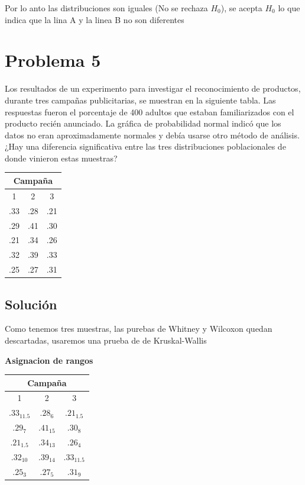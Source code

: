 \documentclass{article}
\begin{document}
Por lo anto las distribuciones son iguales (No se rechaza $H_0$), se acepta $H_0$ lo que indica que la lina A y la linea B no son diferentes

\section{Problema 5}
Los resultados de un experimento para investigar el reconocimiento de productos, durante tres campañas publicitarias, se muestran en la siguiente tabla. Las respuestas fueron el porcentaje de 400 adultos que estaban familiarizados con el producto recién anunciado. La gráfica de probabilidad normal indicó que los datos no eran aproximadamente normales y debía usarse otro método de análisis. ¿Hay una diferencia significativa entre las tres distribuciones poblacionales de donde vinieron estas muestras?

\begin{center}
    \begin{tabular}{c |c |c}
        \multicolumn{3}{c}{Campaña} \\
        \hline
        1   & 2   & 3               \\
        .33 & .28 & .21             \\
        .29 & .41 & .30             \\
        .21 & .34 & .26             \\
        .32 & .39 & .33             \\
        .25 & .27 & .31             \\
    \end{tabular}
\end{center}

\subsection*{Solución}

Como tenemos tres muestras, las purebas de Whitney y Wilcoxon quedan descartadas, usaremos una prueba de de Kruskal-Wallis

\textbf{Asignacion de rangos}

\begin{center}
    \begin{tabular}{c |c |c}
        \multicolumn{3}{c}{Campaña}              \\
        \hline
        1            & 2          & 3            \\
        $.33_{11.5}$ & $.28_{6}$  & $.21_{1.5}$  \\
        $.29_{7}$    & $.41_{15}$ & $.30_{8}$    \\
        $.21_{1.5}$  & $.34_{13}$ & $.26_{4}$    \\
        $.32_{10}$   & $.39_{14}$ & $.33_{11.5}$ \\
        $.25_{3}$    & $.27_{5}$  & $.31_{9}$    \\
    \end{tabular}
\end{center}
\end{document}
